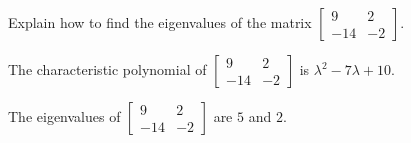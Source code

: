 
\begin{exerciseStatement}


Explain how to find the eigenvalues of the matrix \( \left[\begin{array}{cc}
9 & 2 \\
-14 & -2
\end{array}\right] \).


\end{exerciseStatement}
    
\begin{exerciseAnswer} 


The characteristic polynomial of \( \left[\begin{array}{cc}
9 & 2 \\
-14 & -2
\end{array}\right] \) is \( \lambda^{2} - 7 \lambda + 10 \).



The eigenvalues of \( \left[\begin{array}{cc}
9 & 2 \\
-14 & -2
\end{array}\right] \) are \( 5 \) and \( 2 \).


\end{exerciseAnswer}
    
